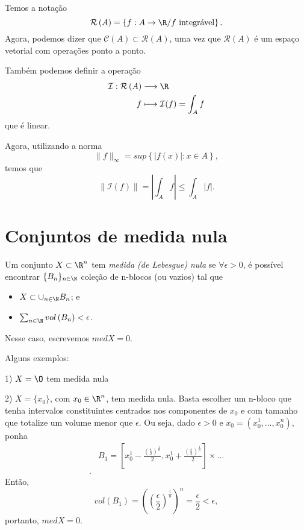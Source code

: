 
Temos a notação \[
\mathcal{R}\left( A \right) = \left\{ f:A\to \R / f \text{ integrável} \right\} 
.\] Agora, podemos dizer que $\mathcal{C}\left( A \right) \subset \mathcal{R}\left( A \right) $, uma vez que $\mathcal{R}\left( A \right) $ é um espaço vetorial com operações ponto a ponto.

Também podemos definir a operação
\begin{align*}
    \mathcal{I}: \mathcal{R}\left( A \right)  &\longrightarrow \R \\
    f &\longmapsto \mathcal{I}(f) = \int_A f
\end{align*}
que é linear.

Agora, utilizando a norma \[
    \|f\|_{\infty} = sup\left\{ |f\left( x \right) | : x\in A \right\} 
,\] temos que \[
\|\mathcal{I}\left( f \right) \| = \left| \int_A f \right| \le \int_A \left| f \right| 
.\] 

\section*{Conjuntos de medida nula}

\begin{definition}
    Um conjunto $X\subset \R^{n}$ tem \emph{medida (de Lebesgue) nula} se $\forall \epsilon>0$, é possível encontrar $\{B_n\}_{n\in \N}$ coleção de n-blocos (ou vazios) tal que
    \begin{itemize}
        \item $X \subset \cup_{n\in \N}B_n$; e
	\item $\sum_{n\in \N} vol\left( B_n \right) < \epsilon$.
    \end{itemize}
    Nesse caso, escrevemos $med X = 0$.
\end{definition}

Alguns exemplos:
\begin{eg}
    1) $X=\O$ tem medida nula
\end{eg}
\begin{eg}
    2) $X = \{x_0\}$, com $x_0\in \R^{n}$, tem medida nula. Basta escolher um n-bloco que tenha intervalos constituintes centrados nos componentes de $x_0$ e com tamanho que totalize um volume menor que $\epsilon$. Ou seja, dado $\epsilon>0$ e $x_0 = \left( x_0^{1},\ldots,x_0^{n} \right) $, ponha 
    \begin{align*}
    & B_1 = \left[ x_0^{1}-\frac{\left(  \frac{\epsilon}{2}\right) ^{\frac{1}{n}}}{2}, x_0^{1}+\frac{\left(  \frac{\epsilon}{2}\right) ^{\frac{1}{n}}}{2}  \right] \times \ldots \\
    .\end{align*}
    Então, \[
    vol \left( B_1 \right) = \left( \left(  \frac{\epsilon}{2}\right)^{\frac{1}{n}} \right)^{n} = \frac{\epsilon}{2} < \epsilon
    ,\] portanto, $med X = 0$.
\end{eg}

